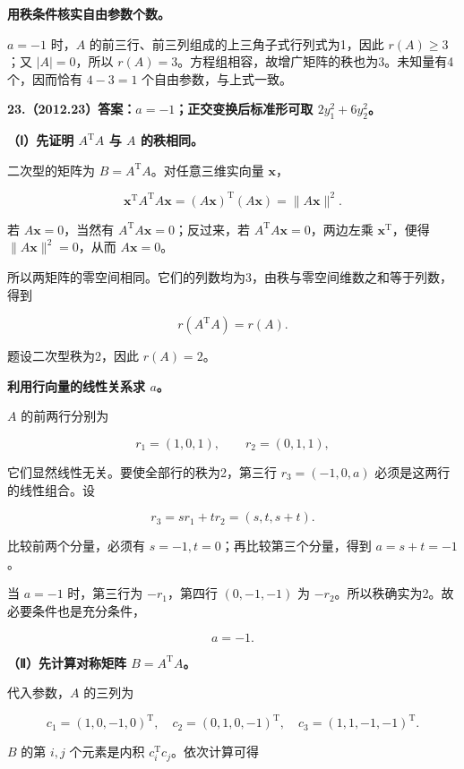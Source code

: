 \documentclass[UTF8,11pt,fontset=windows]{ctexart}
\begin{document}
\textbf{用秩条件核实自由参数个数。}

$a=-1$ 时，$A$ 的前三行、前三列组成的上三角子式行列式为1，因此 $r(A)\ge3$；又 $|A|=0$，所以 $r(A)=3$。方程组相容，故增广矩阵的秩也为3。未知量有4个，因而恰有 $4-3=1$ 个自由参数，与上式一致。

\clearpage

\textbf{23.（2012.23）答案：$a=-1$；正交变换后标准形可取 $2y_1^2+6y_2^2$。}

\textbf{（Ⅰ）先证明 $A^{\mathrm T}A$ 与 $A$ 的秩相同。}

二次型的矩阵为 $B=A^{\mathrm T}A$。对任意三维实向量 $\boldsymbol x$，

$$
\boldsymbol x^{\mathrm T}A^{\mathrm T}A\boldsymbol x
=(A\boldsymbol x)^{\mathrm T}(A\boldsymbol x)
=\|A\boldsymbol x\|^2.
$$

若 $A\boldsymbol x=0$，当然有 $A^{\mathrm T}A\boldsymbol x=0$；反过来，若 $A^{\mathrm T}A\boldsymbol x=0$，两边左乘 $\boldsymbol x^{\mathrm T}$，便得 $\|A\boldsymbol x\|^2=0$，从而 $A\boldsymbol x=0$。

所以两矩阵的零空间相同。它们的列数均为3，由秩与零空间维数之和等于列数，得到

$$
r(A^{\mathrm T}A)=r(A).
$$

题设二次型秩为2，因此 $r(A)=2$。

\textbf{利用行向量的线性关系求 $a$。}

$A$ 的前两行分别为

$$
r_1=(1,0,1),
\qquad r_2=(0,1,1),
$$

它们显然线性无关。要使全部行的秩为2，第三行 $r_3=(-1,0,a)$ 必须是这两行的线性组合。设

$$
r_3=s r_1+t r_2=(s,t,s+t).
$$

比较前两个分量，必须有 $s=-1,t=0$；再比较第三个分量，得到 $a=s+t=-1$。

当 $a=-1$ 时，第三行为 $-r_1$，第四行 $(0,-1,-1)$ 为 $-r_2$。所以秩确实为2。故必要条件也是充分条件，

$$
a=-1.
$$

\textbf{（Ⅱ）先计算对称矩阵 $B=A^{\mathrm T}A$。}

代入参数，$A$ 的三列为

$$
c_1=(1,0,-1,0)^{\mathrm T},\quad
c_2=(0,1,0,-1)^{\mathrm T},\quad
c_3=(1,1,-1,-1)^{\mathrm T}.
$$

$B$ 的第 $i,j$ 个元素是内积 $c_i^{\mathrm T}c_j$。依次计算可得
\end{document}
